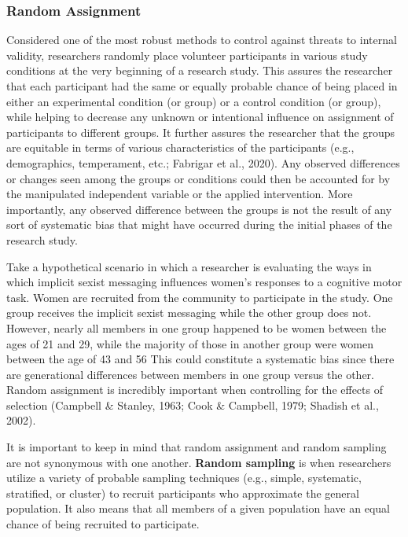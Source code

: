 \documentclass[
  11pt,
]{book}
\begin{document}
\subsubsection{Random Assignment}\label{random-assignment}

Considered one of the most robust methods to control against threats to internal validity, researchers randomly place volunteer participants in various study conditions at the very beginning of a research study. This assures the researcher that each participant had the same or equally probable chance of being placed in either an experimental condition (or group) or a control condition (or group), while helping to decrease any unknown or intentional influence on assignment of participants to different groups. It further assures the researcher that the groups are equitable in terms of various characteristics of the participants (e.g., demographics, temperament, etc.; Fabrigar et al., 2020). Any observed differences or changes seen among the groups or conditions could then be accounted for by the manipulated independent variable or the applied intervention. More importantly, any observed difference between the groups is not the result of any sort of systematic bias that might have occurred during the initial phases of the research study.

Take a hypothetical scenario in which a researcher is evaluating the ways in which implicit sexist messaging influences women's responses to a cognitive motor task. Women are recruited from the community to participate in the study. One group receives the implicit sexist messaging while the other group does not. However, nearly all members in one group happened to be women between the ages of 21 and 29, while the majority of those in another group were women between the age of 43 and 56 This could constitute a systematic bias since there are generational differences between members in one group versus the other. Random assignment is incredibly important when controlling for the effects of selection (Campbell \& Stanley, 1963; Cook \& Campbell, 1979; Shadish et al., 2002).

It is important to keep in mind that random assignment and random sampling are not synonymous with one another. \textbf{Random sampling} is when researchers utilize a variety of probable sampling techniques (e.g., simple, systematic, stratified, or cluster) to recruit participants who approximate the general population. It also means that all members of a given population have an equal chance of being recruited to participate.
\end{document}
